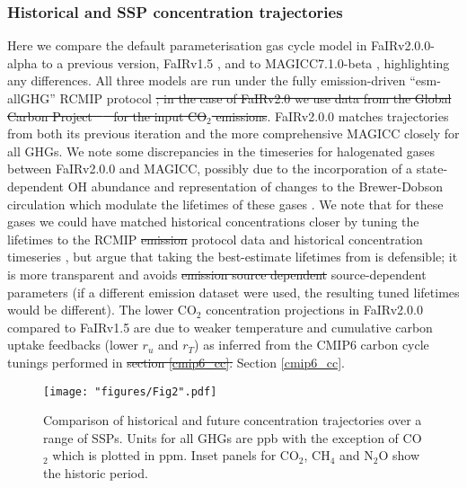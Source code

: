 \documentclass[gmd, manuscript]{copernicus}
\providecommand{\DIFadd}[1]{{\protect\color{blue}#1}} %
\providecommand{\DIFdel}[1]{{\protect\color{red}\sout{#1}}}                      %
\providecommand{\DIFaddbegin}{} %
\providecommand{\DIFaddend}{} %
\providecommand{\DIFdelbegin}{} %
\providecommand{\DIFdelend}{} %
\providecommand{\DIFaddbeginFL}{} %
\providecommand{\DIFaddendFL}{} %
\providecommand{\DIFdelbeginFL}{} %
\providecommand{\DIFdelendFL}{} %
\begin{document}
\subsubsection{Historical and SSP concentration trajectories}
Here we compare the default parameterisation gas cycle model in FaIRv2.0\DIFaddbegin \DIFadd{.0-alpha }\DIFaddend to a previous version, FaIRv1.5 \citep{Smith2018}, and to MAGICC7.1.0-beta \citep{Meinshausen2019}, highlighting any differences. All three models are run under the fully emission-driven ``esm-allGHG'' RCMIP protocol \citep{Nicholls2019}\DIFdelbegin \DIFdel{; in the case of FaIRv2.0 we use data from the Global Carbon Project \mbox{%
\citep{Friedlingstein2019} }\hspace{0pt}%
for the input CO$_2$ emissions}\DIFdelend . FaIRv2.0\DIFaddbegin \DIFadd{.0 }\DIFaddend matches trajectories from both its previous iteration and the more comprehensive MAGICC closely for all GHGs. We note some discrepancies in the timeseries for halogenated gases between FaIRv2.0\DIFaddbegin \DIFadd{.0 }\DIFaddend and MAGICC, possibly due to the incorporation of a state-dependent OH abundance and representation of changes to the Brewer-Dobson circulation which modulate the lifetimes of these gases \citep{Meinshausen2011}. We note that for these gases we could have matched historical concentrations closer by tuning the lifetimes to the RCMIP \DIFdelbegin \DIFdel{emission }\DIFdelend \DIFaddbegin \DIFadd{protocol data }\DIFaddend and historical concentration timeseries \citep{Nicholls2019,Meinshausen2017}, but argue that taking the best-estimate lifetimes from \cite{WMOAppA} is defensible; it is more transparent and avoids \DIFdelbegin \DIFdel{emission source dependent }\DIFdelend \DIFaddbegin \DIFadd{source-dependent }\DIFaddend parameters (if a different emission dataset were used, the resulting tuned lifetimes would be different). The lower CO$_2$ concentration projections in FaIRv2.0\DIFaddbegin \DIFadd{.0 }\DIFaddend compared to FaIRv1.5 are due to weaker temperature and cumulative carbon uptake feedbacks (lower $r_u$ and $r_T$) as inferred from the CMIP6 carbon cycle tunings performed in \DIFdelbegin \DIFdel{section \ref{cmip6_cc}. 
}%
\DIFdelend \DIFaddbegin \DIFadd{Section \ref{cmip6_cc}. 
}\clearpage
\DIFaddend \begin{figure}[t]
    \DIFdelbeginFL %
\DIFdelendFL \DIFaddbeginFL \texttt{[image: "figures/Fig2".pdf]}
    \DIFaddendFL \caption{Comparison of historical and future concentration trajectories over a range of SSPs. Units for all GHGs are ppb with the exception of CO$_2$ which is plotted in ppm. Inset panels for CO$_2$, CH$_4$ and N$_2$O show the historic period.}
    \label{fig:conc_trajectories}
\end{figure}
\clearpage
\end{document}
